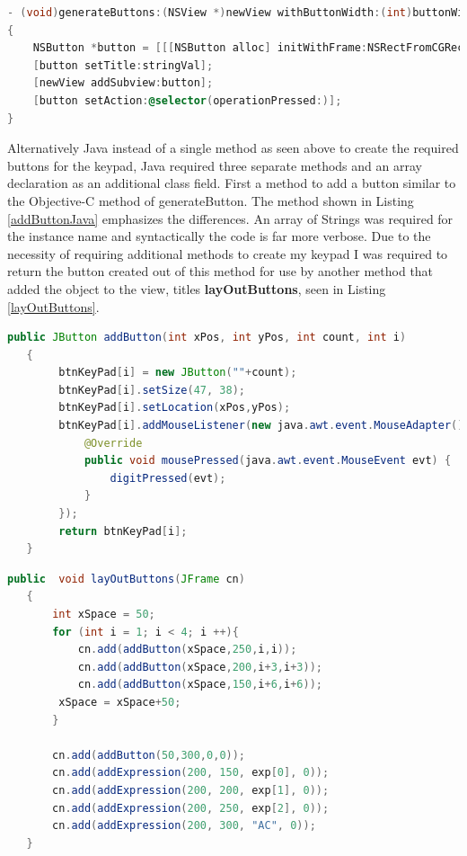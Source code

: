 \documentclass[a4paper,14pt]{article}
\begin{document}
\begin{lstlisting}[caption={Create Button - Objective-C},language=C,label=generateButtonObj,]
- (void)generateButtons:(NSView *)newView withButtonWidth:(int)buttonWidth andbuttonHeight:(int)buttonHeight andWhiteSpace:(int)whiteSpace withXPos:(int)xPos andYPos:(int)yPos withAdder:(int)adder andValue:(NSString *)stringVal
{
    NSButton *button = [[[NSButton alloc] initWithFrame:NSRectFromCGRect(CGRectMake(xPos, yPos , buttonWidth, buttonHeight)) ]autorelease];
    [button setTitle:stringVal];
    [newView addSubview:button];
    [button setAction:@selector(operationPressed:)];
}
\end{lstlisting}
Alternatively Java instead of a single method as seen above to create the required buttons for the keypad, Java required three separate methods and an array declaration as an additional class field.
First a method to add a button similar to the Objective-C method of generateButton. The method shown in Listing \ref{addButtonJava} emphasizes the differences. An array of Strings was required for the instance name and syntactically the code is far more verbose. Due to the necessity of requiring additional methods to create my keypad I was required to return the button created out of this method for use by another method that added the object to the view, titles \textbf{layOutButtons}, seen in Listing \ref{layOutButtons}.\newpage
\begin{lstlisting}[caption={Create Button - Java},language=Java,label=addButtonJava,]
public JButton addButton(int xPos, int yPos, int count, int i)
   {
        btnKeyPad[i] = new JButton(""+count);
        btnKeyPad[i].setSize(47, 38);
        btnKeyPad[i].setLocation(xPos,yPos);
        btnKeyPad[i].addMouseListener(new java.awt.event.MouseAdapter() {
            @Override
            public void mousePressed(java.awt.event.MouseEvent evt) {
                digitPressed(evt);
            }
        });              
        return btnKeyPad[i];
   }
\end{lstlisting}
\begin{lstlisting}[caption={Lay Out Buttons - Java},language=Java,label=layOutButtons,]
public  void layOutButtons(JFrame cn)
   {
       int xSpace = 50;
       for (int i = 1; i < 4; i ++){
           cn.add(addButton(xSpace,250,i,i));
           cn.add(addButton(xSpace,200,i+3,i+3));
           cn.add(addButton(xSpace,150,i+6,i+6));
        xSpace = xSpace+50;
       }
       
       cn.add(addButton(50,300,0,0));
       cn.add(addExpression(200, 150, exp[0], 0));
       cn.add(addExpression(200, 200, exp[1], 0));
       cn.add(addExpression(200, 250, exp[2], 0));
       cn.add(addExpression(200, 300, "AC", 0));
   }
\end{lstlisting}
\end{document}
